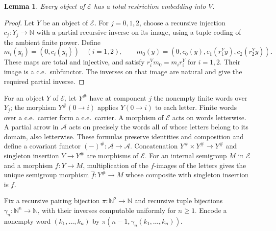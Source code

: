 \documentclass[11pt]{article}
\newtheorem{lemma}[theorem]{Lemma}
\newcommand{\N}{\mathbb N}
\begin{document}
\begin{lemma}\label{lem:fork-dominance}
Every object of $\mathcal E$ has a total restriction embedding
into $V$.
\end{lemma}
\begin{proof}
Let $Y$ be an object of $\mathcal E$. For $j=0,1,2$, choose a
recursive injection $c_j:Y_j\to\N$
with a partial recursive inverse on its image, using a tuple
coding of the ambient finite power. Define
\[
 m_i(y_i)=(0,c_i(y_i))\quad(i=1,2),\qquad
 m_0(y)=(0,c_0(y),c_1(r_1^Yy),c_2(r_2^Yy)).
\]
These maps are total and injective, and satisfy
$r_i^Vm_0=m_i r_i^Y$ for $i=1,2$.
Their image is a c.e.\ subfunctor. The inverses on that image
are natural and give the required partial inverse.
\end{proof}

For an object $Y$ of $\mathcal E$, let $Y^\#$ have at component $j$ the
nonempty finite words over $Y_j$; the morphism $Y^\#(0\to i)$
applies $Y(0\to i)$ to each letter. Finite words over a c.e.\ carrier form
a c.e.\ carrier. A morphism of $\mathcal E$ acts on words letterwise.
A partial arrow in $\mathcal A$ acts on precisely the words all of whose
letters belong to its domain, also letterwise. These formulas
preserve identities and composition and define a covariant functor
$(-)^\#:\mathcal A\to\mathcal A$. Concatenation
$Y^\#\times Y^\#\to Y^\#$ and singleton insertion
$Y\to Y^\#$ are morphisms of $\mathcal E$. For an internal semigroup $M$
in $\mathcal E$ and a morphism $f:Y\to M$, multiplication of the
$f$-images of the letters gives the unique semigroup morphism
$\widehat f:Y^\#\to M$ whose composite with singleton insertion is $f$.

Fix a recursive pairing bijection
$\pi:\N^2\to\N$ and recursive tuple bijections
$\gamma_n:\N^n\to\N$, with their inverses computable uniformly
for $n\ge1$. Encode a nonempty word $(k_1,\ldots,k_n)$ by
$\pi(n-1,\gamma_n(k_1,\ldots,k_n))$.
\end{document}
